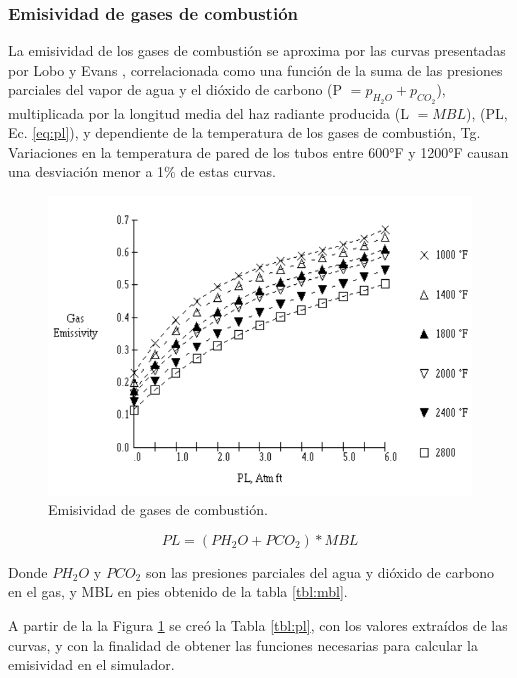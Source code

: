 \subsubsection{Emisividad de gases de combustión}
\par La emisividad de los gases de combustión se aproxima por las curvas presentadas por Lobo y Evans \cite{bib:rad}, correlacionada como una función de la suma de las presiones parciales del vapor de agua y el dióxido de carbono (P $= p_{H_2O} + p_{CO_2}$), multiplicada por la longitud media del haz radiante producida (L $= MBL$), (PL, Ec. \ref{eq:pl}), y dependiente de la temperatura de los gases de combustión, Tg. Variaciones en la temperatura de pared de los tubos entre 600°F y 1200°F causan una desviación menor a 1\% de estas curvas.
\begin{figure}[H]
\begin{center}
\includegraphics[scale=0.42]{images/emiss}
\caption[Emisividad de gases de combustión]{Emisividad de gases de combustión.\cite{bib:mekler}}
\label{fig:emiss}
\end{center}
\end{figure}
\begin{equation}
\label{eq:pl}
PL = (PH_2O + PCO_2) * MBL
\end{equation}
\par Donde $PH_2O$ y $PCO_2$ son las presiones parciales del agua y dióxido de carbono en el gas, y MBL en pies obtenido de la tabla \ref{tbl:mbl}.
\par A partir de la la Figura \ref{fig:emiss} se creó la Tabla \ref{tbl:pl}, con los valores extraídos de las curvas, y con la finalidad de obtener las funciones necesarias para calcular la emisividad en el simulador.
